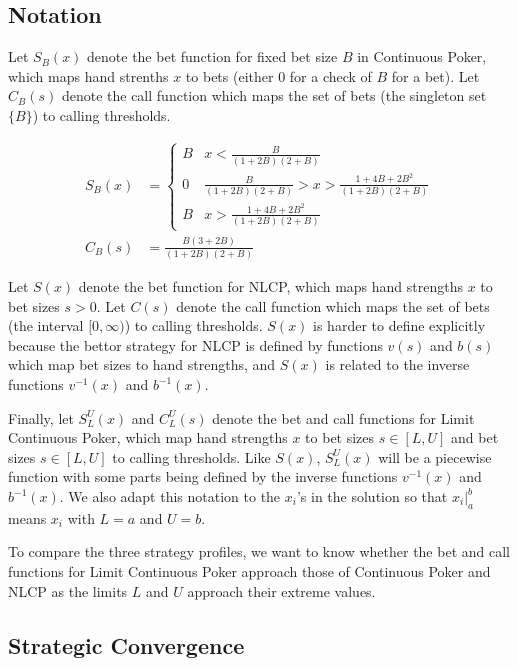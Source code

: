 \documentclass[a4paper,12pt]{article}
\theoremstyle{plain}
\theoremstyle{definition}
\begin{document}
\subsection{Notation}

Let $S_B(x)$ denote the bet function for fixed bet size $B$ in Continuous Poker, which maps hand strenths $x$ to bets (either $0$ for a check of $B$ for a bet). Let $C_B(s)$ denote the call function which maps the set of bets (the singleton set $\{B\}$) to calling thresholds. 

\begin{align}
	S_B(x) & = \begin{cases}
    B & x < \frac{B}{(1+2B)(2+B)}\\
    0 & \frac{B}{(1+2B)(2+B)} > x > \frac{1 + 4B + 2B^2}{(1+2B)(2+B)}\\
    B & x > \frac{1 + 4B + 2B^2}{(1+2B)(2+B)}
\end{cases} \\
C_B(s) & = \frac{B(3 +2B)}{(1+2B)(2+B)}
\end{align}

Let $S(x)$ denote the bet function for NLCP, which maps hand strengths $x$ to bet sizes $s > 0$. Let $C(s)$ denote the call function which maps the set of bets (the interval $[0, \infty)$) to calling thresholds. $S(x)$ is harder to define explicitly because the bettor strategy for NLCP is defined by functions $v(s)$ and $b(s)$ which map bet sizes to hand strengths, and $S(x)$ is related to the inverse functions $v^{-1}(x)$ and $b^{-1}(x)$. 

Finally, let $S_L^U(x)$ and $C_L^U(s)$ denote the bet and call functions for Limit Continuous Poker, which map hand strengths $x$ to bet sizes $s \in [L, U]$ and bet sizes $s \in [L, U]$ to calling thresholds. Like $S(x)$, $S_L^U(x)$ will be a piecewise function with some parts being defined by the inverse functions $v^{-1}(x)$ and $b^{-1}(x)$. We also adapt this notation to the $x_i$'s in the solution so that $x_i|_a^b$ means $x_i$ with $L=a$ and $U=b$.

To compare the three strategy profiles, we want to know whether the bet and call functions for Limit Continuous Poker approach those of Continuous Poker and NLCP as the limits $L$ and $U$ approach their extreme values.

\subsection{Strategic Convergence}
\label{sec:strategic_convergence}
\end{document}
